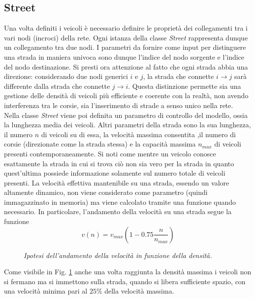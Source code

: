\documentclass[12pt,a4paper]{report}
\begin{document}
\subsection{Street}
Una volta definiti i veicoli è necessario definire le proprietà dei collegamenti tra i vari nodi (incroci) della rete.
Ogni istanza della classe \emph{Street} rappresenta dunque un collegamento tra due nodi.
I parametri da fornire come input per distinguere una strada in maniera univoca sono dunque l'indice del nodo sorgente e l'indice del nodo destinazione.
Si presti ora attenzione al fatto che ogni strada abbia una direzione: considerando due nodi generici $i$ e $j$, la strada che connette $i\to j$ sarà differente dalla strada che connette $j \to i$.
Questa distinzione permette sia una gestione delle densità di veicoli più efficiente e coerente con la realtà, non avendo interferenza tra le corsie, sia l'inserimento di strade a senso unico nella rete.\\
Nella classe \emph{Street} viene poi definita un parametro di controllo del modello, ossia la lunghezza media dei veicoli.
Altri parametri della strada sono la sua lunghezza, il numero $n$ di veicoli su di essa, la velocità massima consentita ,il numero di corsie (direzionate come la strada stessa) e la capacità massima $n_{max}$ di veicoli presenti contemporaneamente.
Si noti come mentre un veicolo conosce esattamente la strada in cui si trova ciò non sia vero per la strada in quanto quest'ultima possiede informazione solamente sul numero totale di veicoli presenti.
La velocità effettiva mantenibile su una strada, essendo un valore altamente dinamico, non viene considerato come parametro (quindi immagazzinato in memoria) ma viene calcolato tramite una funzione quando necessario.
In particolare, l'andamento della velocità su una strada segue la funzione
\begin{equation}
    v(n)=v_{max}\left(1-0.75\frac{n}{n_{max}}\right)
    \label{equation:velocity}
\end{equation}
\begin{figure}[H]
    \centering
    \caption[Velocità nel modello]{\emph{Ipotesi dell'andamento della velocità in funzione della densità.}}
    \label{figure:velocity}
\end{figure}
Come visibile in Fig. \ref{figure:velocity} anche una volta raggiunta la densità massima i veicoli non si fermano ma si immettono sulla strada, quando si libera sufficiente spazio, con una velocità minima pari al $25\%$ della velocità massima.
\end{document}
